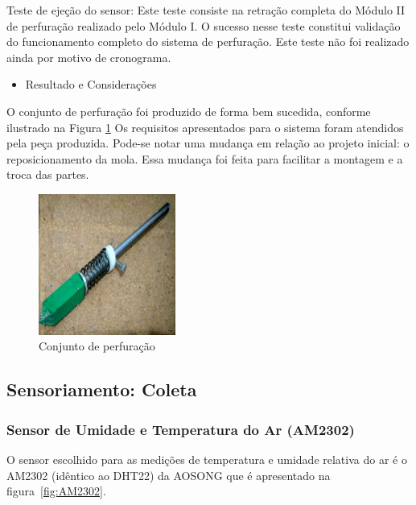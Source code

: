 	Teste de ejeção do sensor: Este teste consiste na retração completa do Módulo II de perfuração realizado pelo Módulo I. O sucesso nesse teste constitui validação do funcionamento completo do sistema de perfuração. Este teste não foi realizado ainda por motivo de cronograma.
	
	\begin{itemize}
		\item Resultado e Considerações
	\end{itemize}
	
	O conjunto de perfuração foi produzido de forma bem sucedida, conforme ilustrado na Figura \ref{fig:perfuracao} Os requisitos apresentados para o sistema foram atendidos pela peça produzida. 
	Pode-se notar uma mudança em relação ao projeto inicial: o reposicionamento da mola. Essa mudança foi feita para facilitar a montagem e a troca das partes.
	
	\begin{figure}[!htbp]
		\centering
		\includegraphics[keepaspectratio=true, width=0.4\textwidth]{figuras/perfuracao23.eps}
		\caption{Conjunto de perfuração}
		\label{fig:perfuracao}
	\end{figure}
	
\subsection{Sensoriamento: Coleta}


	\subsubsection{Sensor de Umidade e Temperatura do Ar (AM2302)}

		O sensor escolhido para as medições de temperatura e umidade relativa do ar
		é o AM2302 (idêntico ao DHT22) da AOSONG que é apresentado na figura~\ref{fig:AM2302}. 

